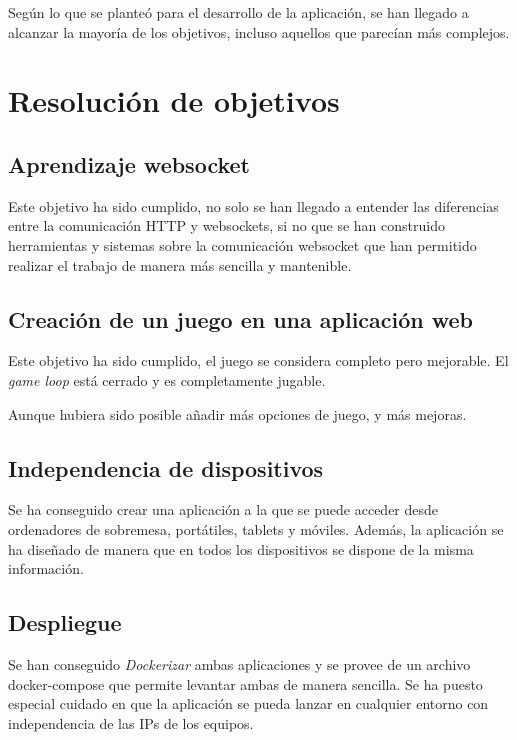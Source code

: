  Según lo que se planteó para el desarrollo de la aplicación, se han llegado a alcanzar la mayoría de los objetivos, incluso aquellos que parecían más complejos.

\section{Resolución de objetivos}

\subsection{Aprendizaje websocket}
Este objetivo ha sido cumplido,  no solo se han llegado a entender las diferencias entre la comunicación HTTP y websockets, si no que se han construido herramientas y sistemas sobre la comunicación websocket que han permitido realizar el trabajo de manera más sencilla y mantenible.

\subsection{Creación de un juego en una aplicación web}
Este objetivo ha sido cumplido, el juego se considera completo pero mejorable. El \textit{game loop} está cerrado y es completamente jugable.

Aunque hubiera sido posible añadir más opciones de juego, y más mejoras.

\subsection{Independencia de dispositivos}
Se ha conseguido crear una aplicación a la que se puede acceder desde ordenadores de sobremesa, portátiles, tablets y móviles. Además, la aplicación se ha diseñado de manera que en todos los dispositivos se dispone de la misma información.

\subsection{Despliegue}
Se han conseguido \textit{Dockerizar} ambas aplicaciones y se provee de un archivo docker-compose que permite levantar ambas de manera sencilla. Se ha puesto especial cuidado en que la aplicación se pueda lanzar en cualquier entorno con independencia de las IPs de los equipos.

